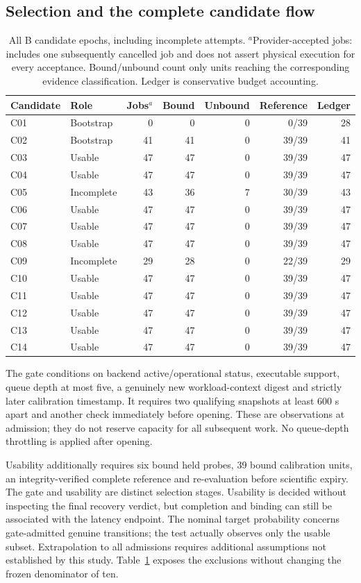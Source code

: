 \documentclass[11pt,a4paper]{article}
\begin{document}
\subsection{Selection and the complete candidate flow}
\begin{table}[htbp]\centering\small
\begin{tabular}{llrrrrr}\toprule
Candidate & Role & Jobs$^a$ & Bound & Unbound & Reference & Ledger\\\midrule
C01 & Bootstrap & 0 & 0 & 0 & 0/39 & 28\\
C02 & Bootstrap & 41 & 41 & 0 & 39/39 & 41\\
C03 & Usable & 47 & 47 & 0 & 39/39 & 47\\
C04 & Usable & 47 & 47 & 0 & 39/39 & 47\\
C05 & Incomplete & 43 & 36 & 7 & 30/39 & 43\\
C06 & Usable & 47 & 47 & 0 & 39/39 & 47\\
C07 & Usable & 47 & 47 & 0 & 39/39 & 47\\
C08 & Usable & 47 & 47 & 0 & 39/39 & 47\\
C09 & Incomplete & 29 & 28 & 0 & 22/39 & 29\\
C10 & Usable & 47 & 47 & 0 & 39/39 & 47\\
C11 & Usable & 47 & 47 & 0 & 39/39 & 47\\
C12 & Usable & 47 & 47 & 0 & 39/39 & 47\\
C13 & Usable & 47 & 47 & 0 & 39/39 & 47\\
C14 & Usable & 47 & 47 & 0 & 39/39 & 47\\
\bottomrule
\end{tabular}
{}
\caption{All B candidate epochs, including incomplete attempts. $^a$Provider-accepted jobs: includes one subsequently cancelled job and does not assert physical execution for every acceptance. Bound/unbound count only units reaching the corresponding evidence classification. Ledger is conservative budget accounting.}\label{tab:bflow}
\end{table}
The gate conditions on backend active/operational status, executable support, queue depth at most five, a genuinely new workload-context digest and strictly later calibration timestamp. It requires two qualifying snapshots at least 600 s apart and another check immediately before opening. These are observations at admission; they do not reserve capacity for all subsequent work. No queue-depth throttling is applied after opening.

Usability additionally requires six bound held probes, 39 bound calibration units, an integrity-verified complete reference and re-evaluation before scientific expiry. The gate and usability are distinct selection stages. Usability is decided without inspecting the final recovery verdict, but completion and binding can still be associated with the latency endpoint. The nominal target probability concerns gate-admitted genuine transitions; the test actually observes only the usable subset. Extrapolation to all admissions requires additional assumptions not established by this study. Table~\ref{tab:bflow} exposes the exclusions without changing the frozen denominator of ten.
\end{document}
